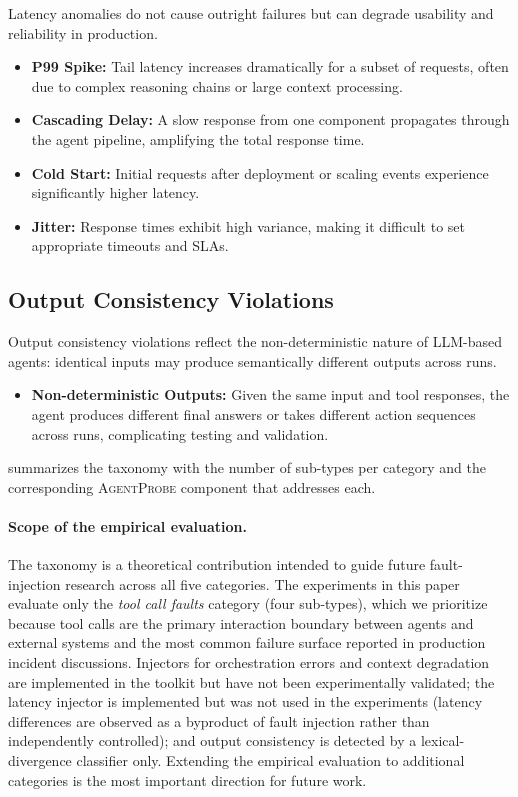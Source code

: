 \documentclass[make,article,submit,moreauthors,pdftex]{mdpi}
\providecommand{\agentprobe}{\textsc{AgentProbe}}
\begin{document}
Latency anomalies do not cause outright failures but can degrade usability and reliability in production.

\begin{itemize}
  \item \textbf{P99 Spike:} Tail latency increases dramatically for a subset of requests, often due to complex reasoning chains or large context processing.
  \item \textbf{Cascading Delay:} A slow response from one component propagates through the agent pipeline, amplifying the total response time.
  \item \textbf{Cold Start:} Initial requests after deployment or scaling events experience significantly higher latency.
  \item \textbf{Jitter:} Response times exhibit high variance, making it difficult to set appropriate timeouts and SLAs.
\end{itemize}

\subsection{Output Consistency Violations}

Output consistency violations reflect the non-deterministic nature of LLM-based agents: identical inputs may produce semantically different outputs across runs.

\begin{itemize}
  \item \textbf{Non-deterministic Outputs:} Given the same input and tool responses, the agent produces different final answers or takes different action sequences across runs, complicating testing and validation.
\end{itemize}

 summarizes the taxonomy with the number of sub-types per category and the corresponding \agentprobe{} component that addresses each.

\paragraph{Scope of the empirical evaluation.} {\color{magenta}The taxonomy is a theoretical contribution intended to guide future fault-injection research across all five categories. The experiments in this paper evaluate only the \emph{tool call faults} category (four sub-types), which we prioritize because tool calls are the primary interaction boundary between agents and external systems and the most common failure surface reported in production incident discussions. Injectors for orchestration errors and context degradation are implemented in the toolkit but have not been experimentally validated; the latency injector is implemented but was not used in the experiments (latency differences are observed as a byproduct of fault injection rather than independently controlled); and output consistency is detected by a lexical-divergence classifier only. Extending the empirical evaluation to additional categories is the most important direction for future work.}
\end{document}
